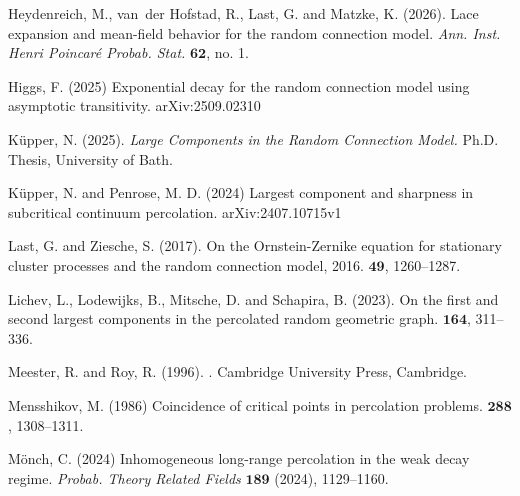 \documentclass[a4paper,12pt]{scrartcl}
\theoremstyle{definition}
\theoremstyle{remark}
\begin{document}
\begin{thebibliography}{}
Heydenreich, M.,  van~der Hofstad, R.,  Last, G.  and
Matzke, K. (2026).
\newblock Lace {e}xpansion and {m}ean-{f}ield {b}ehavior for the {r}andom
{c}onnection {m}odel.
{\em Ann. Inst. Henri Poincar\'{e} Probab. Stat.} $\mathbf{62}$,
no. 1.

Higgs, F. (2025)
Exponential decay for the random connection model using asymptotic transitivity.  arXiv:2509.02310

K\"upper, N. (2025). {\em Large Components in the Random
Connection Model.} Ph.D. Thesis, University of Bath.

K\"upper, N. and Penrose, M. D. (2024)
Largest component and sharpness in subcritical continuum percolation. arXiv:2407.10715v1

Last, G. and  Ziesche, S. (2017).
\newblock On the {O}rnstein-{Z}ernike equation for stationary cluster processes
and the random connection model, 2016.
 $\mathbf{49}$,  %
1260--1287.


Lichev, L.,  Lodewijks, B.,   Mitsche, D.  and Schapira, B. (2023).
\newblock %
On the first and second largest components in the percolated random geometric graph.
 $\mathbf{164}$,  %
311--336.

Meester, R.  and Roy, R. (1996).
.
\newblock %
Cambridge University Press, Cambridge.

Mensshikov, M. (1986)
\newblock  Coincidence of critical points in percolation problems.
 $\mathbf{288}$,
1308--1311.

M\"{o}nch, C. (2024)
\newblock Inhomogeneous long-range percolation in the weak decay regime.
{\em Probab. Theory Related Fields} $\mathbf{189}$ (2024),
1129--1160.


\end{thebibliography}
\end{document}
